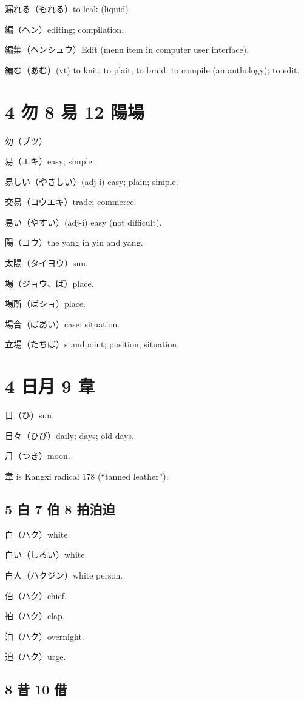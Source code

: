 漏れる（もれる）to leak (liquid)

編（ヘン）editing; compilation.

編集（ヘンシュウ）Edit (menu item in computer user interface).

編む（あむ）(vt)
to knit; to plait; to braid.
to compile (an anthology); to edit.

\section{4 勿 8 易 12 陽場}

勿（ブツ）

易（エキ）easy; simple.

易しい（やさしい）(adj-i) easy; plain; simple.

交易（コウエキ）trade; commerce.

易い（やすい）(adj-i) easy (not difficult).

陽（ヨウ）the yang in yin and yang.

太陽（タイヨウ）sun.

場（ジョウ、ば）place.

場所（ばショ）place.

場合（ばあい）case; situation.

立場（たちば）standpoint; position; situation.

\section{4 日月 9 韋}

日（ひ）sun.

日々（ひび）daily; days; old days.

月（つき）moon.

韋 is Kangxi radical 178 (``tanned leather'').

\subsection{5 白 7 伯 8 拍泊迫}

白（ハク）white.

白い（しろい）white.

白人（ハクジン）white person.

伯（ハク）chief.

拍（ハク）clap.

泊（ハク）overnight.

迫（ハク）urge.

\subsection{8 昔 10 借}

